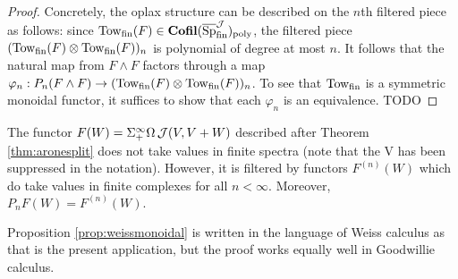\begin{proof}
Concretely, the oplax structure can be described on the $n$th filtered piece as follows: since $\text{Tow}_{\operatorname{\text{fin}}}(F)\in  \operatorname{\textbf{Cofil}}(\overline{\operatorname{\text{Sp}}}^{\operatorname{\mathcal{J}}}_{\operatorname{\text{fin}}})_{\text{poly}}$, the filtered piece $(\text{Tow}_{\operatorname{\text{fin}}}(F) \otimes \text{Tow}_{\operatorname{\text{fin}}}(F))_n$ is polynomial of degree at most $n$.  It follows that the natural map from $F\wedge F$ factors through a map $\varphi_n: P_n(F\wedge F)\to (\text{Tow}_{\operatorname{\text{fin}}}(F) \otimes \text{Tow}_{\operatorname{\text{fin}}}(F))_n$.  To see that $\text{Tow}_{\operatorname{\text{fin}}}$ is a symmetric monoidal functor, it suffices to show that each $\varphi_n$ is an equivalence.   TODO

\end{proof}

\begin{rmk}
The functor $F(W) = \Sigma^{\infty}_+\Omega \operatorname{\mathcal{J}}(V,V+W)$ described after Theorem \ref{thm:aronesplit} does not take values in finite spectra (note that the V has been suppressed in the notation).  However, it is filtered by functors $F^{(n)}(W)$ which do take values in finite complexes for all $n<\infty $.  Moreover, $P_nF(W) = F^{(n)}(W).$  

\end{rmk}

\begin{rmk}
Proposition \ref{prop:weissmonoidal} is written in the language of Weiss calculus as that is the present application, but the proof works equally well in Goodwillie calculus.  
\end{rmk}
